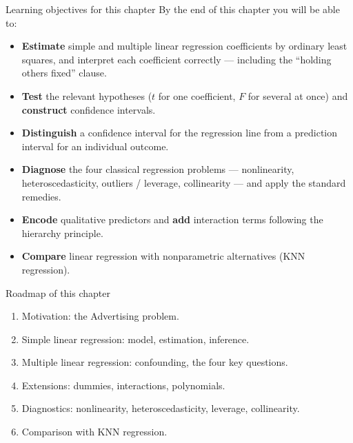 \documentclass[aspectratio=169,11pt]{beamer}
\begin{document}
\begin{frame}{Learning objectives for this chapter}
  By the end of this chapter you will be able to:
  \begin{itemize}
    \item \textbf{Estimate} simple and multiple linear regression
          coefficients by ordinary least squares, and interpret each
          coefficient correctly --- including the ``holding others
          fixed'' clause.
    \item \textbf{Test} the relevant hypotheses ($t$ for one
          coefficient, $F$ for several at once) and \textbf{construct}
          confidence intervals.
    \item \textbf{Distinguish} a confidence interval for the regression
          line from a prediction interval for an individual outcome.
    \item \textbf{Diagnose} the four classical regression problems ---
          nonlinearity, heteroscedasticity, outliers / leverage,
          collinearity --- and apply the standard remedies.
    \item \textbf{Encode} qualitative predictors and \textbf{add}
          interaction terms following the hierarchy principle.
    \item \textbf{Compare} linear regression with nonparametric
          alternatives (KNN regression).
  \end{itemize}
\end{frame}


\begin{frame}{Roadmap of this chapter}
  \begin{takeaway}
    \begin{enumerate}
      \item Motivation: the Advertising problem.
      \item Simple linear regression: model, estimation, inference.
      \item Multiple linear regression: confounding, the four key questions.
      \item Extensions: dummies, interactions, polynomials.
      \item Diagnostics: nonlinearity, heteroscedasticity, leverage,
            collinearity.
      \item Comparison with KNN regression.
    \end{enumerate}
  \end{takeaway}
\end{frame}
\end{document}
